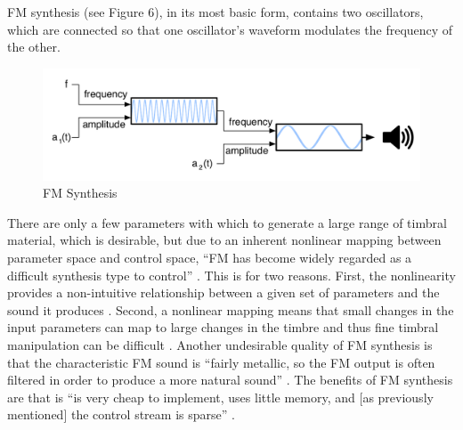 \documentclass[12pt]{report} 	%
\numberwithin{figure}{chapter}
\numberwithin{table}{chapter}
\numberwithin{equation}{chapter}
\begin{document}
\begin{flushleft}
FM synthesis (see Figure 6), in its most basic form, contains two oscillators, which are connected so that one oscillator's waveform modulates the frequency of the other. 
\begin{figure}[h!]
\begin{center}
\includegraphics[scale=0.65]{FMSynthesis}
\caption[FM synthesis]{FM Synthesis}
\end{center}
\end{figure}
There are only a few parameters with which to generate a large range of timbral material, which is desirable, but due to an inherent nonlinear mapping between parameter space and control space, ``FM has become widely regarded as a difficult synthesis type to control'' \cite{Mitchell:2007fe}. This is for two reasons. First, the nonlinearity provides a non-intuitive relationship between a given set of parameters and the sound it produces \cite[p. 45]{Nicol:2005rp}. Second, a  nonlinear mapping means that small changes in the input parameters can map to large changes in the timbre and thus fine timbral manipulation can be difficult \cite[p. 2]{Jaffe:1995fv}. Another undesirable quality of FM synthesis is that the characteristic FM sound is ``fairly metallic, so the FM output is often filtered in order to produce a more natural sound'' \cite[p. 45]{Nicol:2005rp}. The benefits of FM synthesis are that is ``is very cheap to implement, uses little memory, and [as previously mentioned] the control stream is sparse'' \cite[p. 92]{Tolonen:1998bh}.


\end{flushleft}
\end{document}
